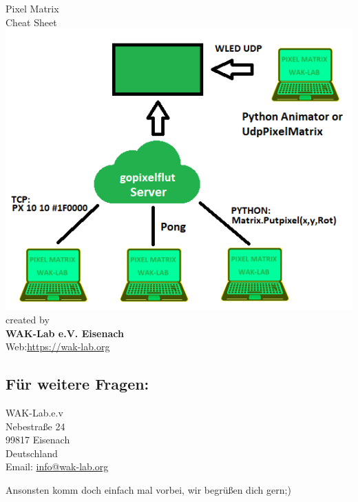 


\begin{center}
	{\Large Pixel Matrix} \\[.3cm]
	{\huge {Cheat Sheet}}\\ [.3cm]
	\includegraphics[width=\linewidth, angle=0, scale=1.0]{pictures/Overview.png}\\
	\label{fig:Pinout}
	\vfill
	created by\\ 
	\textbf{WAK-Lab e.V. Eisenach}\\
	Web:\url{https://wak-lab.org}
\end{center}


\subsection{\large{Für weitere Fragen:}}
WAK-Lab.e.v\\
Nebestraße 24\\
99817 Eisenach\\
Deutschland\\
Email:  \url{info@wak-lab.org}

Ansonsten komm doch einfach mal vorbei, wir begrüßen dich gern;)

\newpage
\vspace*{\fill}
\begin{center}
\end{center}
\vspace*{\fill}



